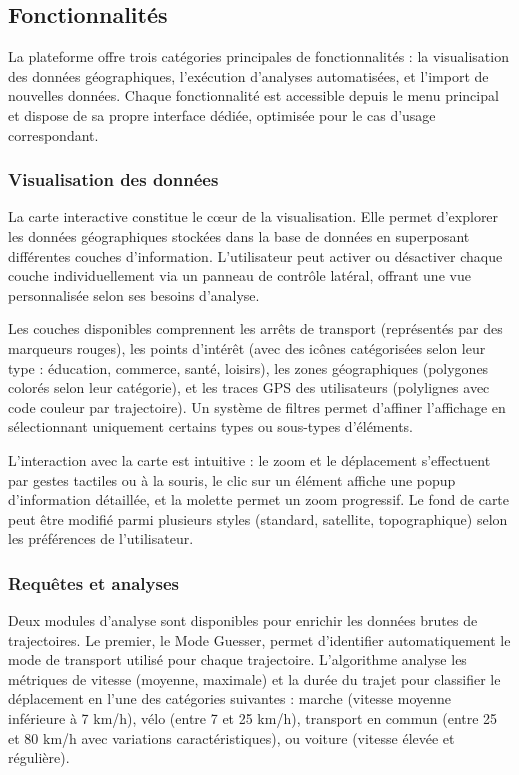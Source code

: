 \documentclass[french]{tai_info} %
\begin{document}
\subsection{Fonctionnalités}

La plateforme offre trois catégories principales de fonctionnalités : la visualisation des données géographiques, l'exécution d'analyses automatisées, et l'import de nouvelles données. Chaque fonctionnalité est accessible depuis le menu principal et dispose de sa propre interface dédiée, optimisée pour le cas d'usage correspondant.

\subsubsection{Visualisation des données}

La carte interactive constitue le cœur de la visualisation. Elle permet d'explorer les données géographiques stockées dans la base de données en superposant différentes couches d'information. L'utilisateur peut activer ou désactiver chaque couche individuellement via un panneau de contrôle latéral, offrant une vue personnalisée selon ses besoins d'analyse.

Les couches disponibles comprennent les arrêts de transport (représentés par des marqueurs rouges), les points d'intérêt (avec des icônes catégorisées selon leur type : éducation, commerce, santé, loisirs), les zones géographiques (polygones colorés selon leur catégorie), et les traces GPS des utilisateurs (polylignes avec code couleur par trajectoire). Un système de filtres permet d'affiner l'affichage en sélectionnant uniquement certains types ou sous-types d'éléments.

L'interaction avec la carte est intuitive : le zoom et le déplacement s'effectuent par gestes tactiles ou à la souris, le clic sur un élément affiche une popup d'information détaillée, et la molette permet un zoom progressif. Le fond de carte peut être modifié parmi plusieurs styles (standard, satellite, topographique) selon les préférences de l'utilisateur.

\subsubsection{Requêtes et analyses}

Deux modules d'analyse sont disponibles pour enrichir les données brutes de trajectoires. Le premier, le Mode Guesser, permet d'identifier automatiquement le mode de transport utilisé pour chaque trajectoire. L'algorithme analyse les métriques de vitesse (moyenne, maximale) et la durée du trajet pour classifier le déplacement en l'une des catégories suivantes : marche (vitesse moyenne inférieure à 7 km/h), vélo (entre 7 et 25 km/h), transport en commun (entre 25 et 80 km/h avec variations caractéristiques), ou voiture (vitesse élevée et régulière).
\end{document}
